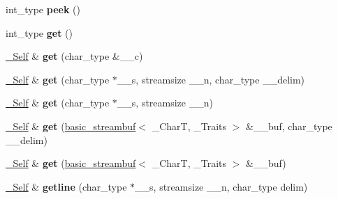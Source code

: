 \begin{DoxyCompactItemize}
\item 
\mbox{\label{classbasic__istream_a1a8c1a849432f4f764315454746c5d5f}} 
int\+\_\+type {\bfseries peek} ()
\item 
\mbox{\label{classbasic__istream_a5e7137912ee5ddeaf5d9cbd7f7da388c}} 
int\+\_\+type {\bfseries get} ()
\item 
\mbox{\label{classbasic__istream_a320bf95300e9c55149fb641ed30cf414}} 
\hyperlink{classbasic__istream}{\+\_\+\+Self} \& {\bfseries get} (char\+\_\+type \&\+\_\+\+\_\+c)
\item 
\mbox{\label{classbasic__istream_a5f1859f553805b5791a101242188fa0b}} 
\hyperlink{classbasic__istream}{\+\_\+\+Self} \& {\bfseries get} (char\+\_\+type $\ast$\+\_\+\+\_\+s, streamsize \+\_\+\+\_\+n, char\+\_\+type \+\_\+\+\_\+delim)
\item 
\mbox{\label{classbasic__istream_a966123c5d0dc0777c71ed5c17f7d88ef}} 
\hyperlink{classbasic__istream}{\+\_\+\+Self} \& {\bfseries get} (char\+\_\+type $\ast$\+\_\+\+\_\+s, streamsize \+\_\+\+\_\+n)
\item 
\mbox{\label{classbasic__istream_a55da2de6062b31393dedf1b74e48d309}} 
\hyperlink{classbasic__istream}{\+\_\+\+Self} \& {\bfseries get} (\hyperlink{classbasic__streambuf}{basic\+\_\+streambuf}$<$ \+\_\+\+CharT, \+\_\+\+Traits $>$ \&\+\_\+\+\_\+buf, char\+\_\+type \+\_\+\+\_\+delim)
\item 
\mbox{\label{classbasic__istream_aa7e8eb501d782e62ed9602be244d7f2a}} 
\hyperlink{classbasic__istream}{\+\_\+\+Self} \& {\bfseries get} (\hyperlink{classbasic__streambuf}{basic\+\_\+streambuf}$<$ \+\_\+\+CharT, \+\_\+\+Traits $>$ \&\+\_\+\+\_\+buf)
\item 
\mbox{\label{classbasic__istream_abfcf0ceee81bfd6bfef2a0936293790c}} 
\hyperlink{classbasic__istream}{\+\_\+\+Self} \& {\bfseries getline} (char\+\_\+type $\ast$\+\_\+\+\_\+s, streamsize \+\_\+\+\_\+n, char\+\_\+type delim)
\item 
\mbox{\label{classbasic__istream_a6da51aee2cb13744cf8c44f3eac9d016}} 

\end{DoxyCompactItemize}

